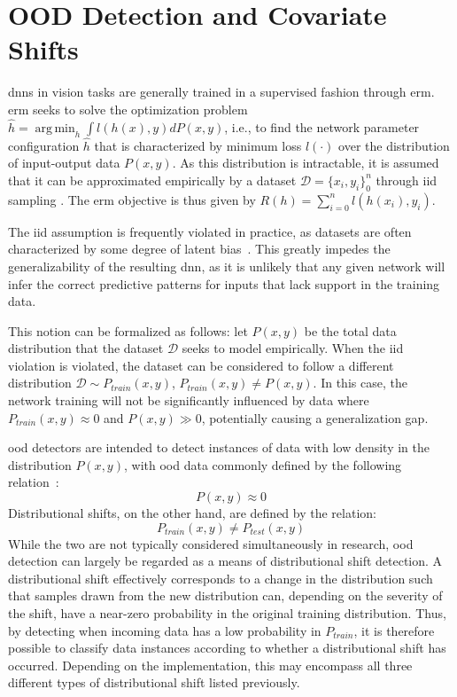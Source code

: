 \documentclass[10pt,twocolumn,letterpaper]{article}
\DeclareMathOperator*{\argmin}{arg\,min}
\begin{document}
\section{OOD Detection and Covariate Shifts}
\Glspl{dnn} in vision tasks are generally trained in a supervised fashion through \gls{erm}. \Gls{erm} seeks to solve the optimization problem \(\hat{h} = \argmin_{h} \int l(h(x),y) dP(x,y)\), i.e., to find the network parameter configuration \(\hat{h}\) that is characterized by minimum loss \(l(\cdot)\) over the distribution of input-output data \(P(x,y)\). As this distribution is intractable, it is assumed that it can be approximated empirically by a dataset \(\mathcal{D}=\{x_i, y_i\}_0^n\) through \gls{iid} sampling . The \gls{erm} objective is thus given by \(R(h)=\sum_{i=0}^n l(h(x_i),y_i)\). 

The \gls{iid} assumption is frequently violated in practice, as datasets are often characterized by some degree of latent bias~\cite{shortcut_learning, damour2020underspecification}. This greatly impedes the generalizability of the resulting \gls{dnn}, as it is unlikely that any given network will infer the correct predictive patterns for inputs that lack support in the training data.

This notion can be formalized as follows: let \(P(x,y)\) be the total data distribution that the dataset \(\mathcal{D}\) seeks to model empirically. When the \gls{iid} violation is violated, the dataset can be considered to follow a different distribution \(\mathcal{D}\sim P_{train}(x,y)\), \(P_{train}(x,y)\neq P(x,y)\). In this case, the network training will not be significantly influenced by data where \(P_{train}(x,y)\approx0\) and \(P(x,y)\gg 0\), potentially causing a generalization gap. 

\Gls{ood} detectors are intended to detect instances of data with low density in the distribution \(P(x,y)\), with \gls{ood} data commonly defined by the following relation~\cite{dsd_survey}:
\begin{equation}
    P(x,y)\approx0
\end{equation}
Distributional shifts, on the other hand, are defined by the relation:
\begin{equation}
    P_{train}(x,y)\neq P_{test}(x,y)
\end{equation}
While the two are not typically considered simultaneously in research, \gls{ood} detection can largely be regarded as a means of distributional shift detection. A distributional shift effectively corresponds to a change in the distribution such that samples drawn from the new distribution can, depending on the severity of the shift, have a near-zero probability in the original training distribution. Thus, by detecting when incoming data has a low probability in \(P_{train}\), it is therefore possible to classify data instances according to whether a distributional shift has occurred. Depending on the implementation, this may encompass all three different types of distributional shift listed previously. 
\end{document}
